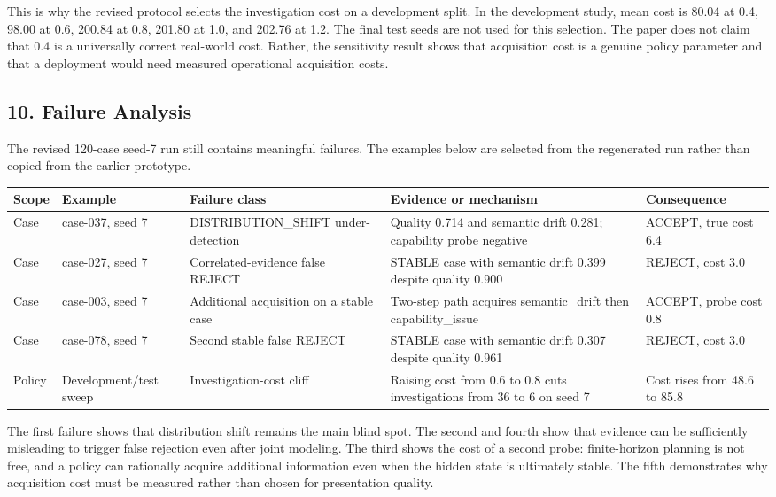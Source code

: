 \documentclass[
]{article}
\begin{document}
This is why the revised protocol selects the investigation cost on a development split. In the development study, mean cost is 80.04 at 0.4, 98.00 at 0.6, 200.84 at 0.8, 201.80 at 1.0, and 202.76 at 1.2. The final test seeds are not used for this selection. The paper does not claim that 0.4 is a universally correct real-world cost. Rather, the sensitivity result shows that acquisition cost is a genuine policy parameter and that a deployment would need measured operational acquisition costs.

\subsection{10. Failure Analysis}\label{10-failure-analysis}

The revised 120-case seed-7 run still contains meaningful failures. The examples below are selected from the regenerated run rather than copied from the earlier prototype.

\begin{longtable}[]{@{}lllll@{}}
\toprule\noalign{}
Scope & Example & Failure class & Evidence or mechanism & Consequence \\
\midrule\noalign{}
\endhead
\bottomrule\noalign{}
\endlastfoot
Case & case-037, seed 7 & DISTRIBUTION\_SHIFT under-detection & Quality 0.714 and semantic drift 0.281; capability probe negative & ACCEPT, true cost 6.4 \\
Case & case-027, seed 7 & Correlated-evidence false REJECT & STABLE case with semantic drift 0.399 despite quality 0.900 & REJECT, cost 3.0 \\
Case & case-003, seed 7 & Additional acquisition on a stable case & Two-step path acquires semantic\_drift then capability\_issue & ACCEPT, probe cost 0.8 \\
Case & case-078, seed 7 & Second stable false REJECT & STABLE case with semantic drift 0.307 despite quality 0.961 & REJECT, cost 3.0 \\
Policy & Development/test sweep & Investigation-cost cliff & Raising cost from 0.6 to 0.8 cuts investigations from 36 to 6 on seed 7 & Cost rises from 48.6 to 85.8 \\
\end{longtable}

The first failure shows that distribution shift remains the main blind spot. The second and fourth show that evidence can be sufficiently misleading to trigger false rejection even after joint modeling. The third shows the cost of a second probe: finite-horizon planning is not free, and a policy can rationally acquire additional information even when the hidden state is ultimately stable. The fifth demonstrates why acquisition cost must be measured rather than chosen for presentation quality.
\end{document}
